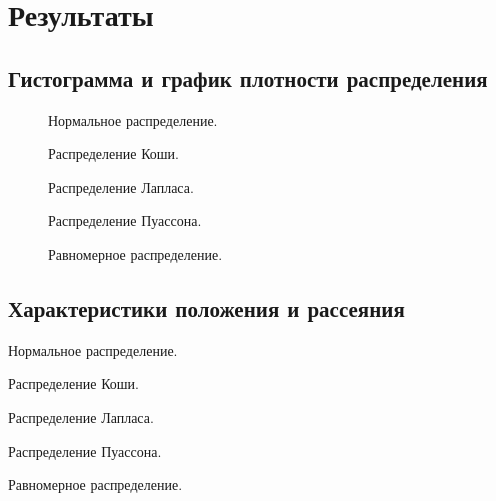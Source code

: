 \section{Результаты}
\subsection{Гистограмма и график плотности распределения}
\begin{figure}[H]
	\caption{ Нормальное распределение.}
	\label{ris:1}
\end{figure}
\begin{figure}[H]
	\caption{ Распределение Коши.}
	\label{ris:2}
\end{figure}
\begin{figure}[H]
	\caption{ Распределение Лапласа.}
	\label{ris:3}
\end{figure}
\begin{figure}[H]
	\caption{ Распределение Пуассона.}
	\label{ris:4}
\end{figure}
\begin{figure}[H]
	\caption{ Равномерное распределение.}
	\label{ris:5}
\end{figure}

\subsection{Характеристики положения и рассеяния}
\begin{table}[H]
	\begin{center}
		
	\end{center}
	\caption{\label{tab:2} Нормальное распределение.}
\end{table}
\begin{table}[H]
	\begin{center}
		
	\end{center}
	\caption{\label{tab:3} Распределение Коши.}
\end{table}
\begin{table}[H]
	\begin{center}
		
	\end{center}
	\caption{\label{tab:4} Распределение Лапласа.}
\end{table}
\begin{table}[H]
	\begin{center}
		
	\end{center}
	\caption{\label{tab:5} Распределение Пуассона.}
\end{table}
\begin{table}[H]
	\begin{center}
		
	\end{center}
	\caption{\label{tab:6} Равномерное распределение.}
\end{table}

